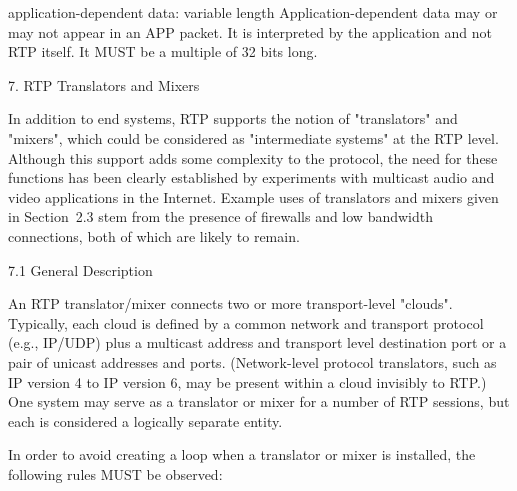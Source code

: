 \documentclass{article}
\begin{document}
application-dependent data: variable length Application-dependent data may or may not appear in an APP packet. It is interpreted by the application and not RTP itself.  It MUST be a multiple of 32 bits long.

7. RTP Translators and Mixers

In addition to end systems, RTP supports the notion of "translators" and "mixers", which could be considered as "intermediate systems" at the RTP level.  Although this support adds some complexity to the protocol, the need for these functions has been clearly established by experiments with multicast audio and video applications in the Internet.  Example uses of translators and mixers given in Section~2.3 stem from the presence of firewalls and low bandwidth connections, both of which are likely to remain.

7.1 General Description

An RTP translator/mixer connects two or more transport-level "clouds".  Typically, each cloud is defined by a common network and transport protocol (e.g., IP/UDP) plus a multicast address and transport level destination port or a pair of unicast addresses and ports.  (Network-level protocol translators, such as IP version 4 to IP version 6, may be present within a cloud invisibly to RTP.)  One system may serve as a translator or mixer for a number of RTP sessions, but each is considered a logically separate entity.

In order to avoid creating a loop when a translator or mixer is installed, the following rules MUST be observed:
\end{document}
